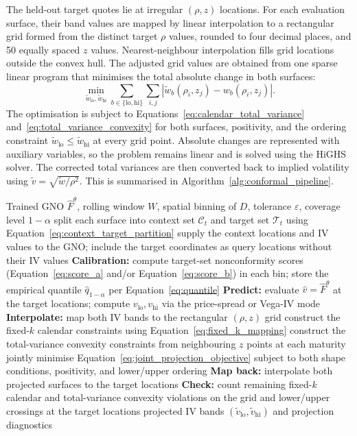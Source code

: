 The held-out target quotes lie at irregular $(\rho,z)$ locations. For each evaluation surface, their band values are mapped by linear interpolation to a rectangular grid formed from the distinct target $\rho$ values, rounded to four decimal places, and 50 equally spaced $z$ values. Nearest-neighbour interpolation fills grid locations outside the convex hull. The adjusted grid values are obtained from one sparse linear program that minimises the total absolute change in both surfaces:
\begin{equation}
    \min_{\widetilde w_{\mathrm{lo}},\widetilde w_{\mathrm{hi}}}
    \sum_{b\in\{\mathrm{lo},\mathrm{hi}\}}\sum_{i,j}
    \left|\widetilde w_b(\rho_i,z_j)-w_b(\rho_i,z_j)\right|.
    \label{eq:joint_projection_objective}
\end{equation}
The optimisation is subject to Equations~\ref{eq:calendar_total_variance} and~\ref{eq:total_variance_convexity} for both surfaces, positivity, and the ordering constraint $\widetilde w_{\mathrm{lo}}\leq\widetilde w_{\mathrm{hi}}$ at every grid point. Absolute changes are represented with auxiliary variables, so the problem remains linear and is solved using the HiGHS solver. The corrected total variances are then converted back to implied volatility using $\widetilde v=\sqrt{\widetilde w/\rho^2}$. This is summarised in Algorithm~\ref{alg:conformal_pipeline}.

\begin{algorithm}
\caption{Conformal bands with finite-grid shape projection}
\label{alg:conformal_pipeline}
\begin{algorithmic}[1]
\Require Trained GNO $\hat{F}^\theta$, rolling window $W$, spatial binning of $D$, tolerance $\varepsilon$, coverage level $1-\alpha$
\State split each surface into context set $\mathcal{C}_t$ and target set $\mathcal{T}_t$ using Equation~\ref{eq:context_target_partition}
\State supply the context locations and IV values to the GNO; include the target coordinates as query locations without their IV values
\State \textbf{Calibration:} compute target-set nonconformity scores (Equation~\ref{eq:score_a} and/or Equation~\ref{eq:score_b}) in each bin; store the empirical quantile $\hat{q}_{1-\alpha}$ per Equation~\ref{eq:quantile}
\State \textbf{Predict:} evaluate $\hat{v} = \hat{F}^\theta$ at the target locations; compute $v_{\text{lo}}, v_{\text{hi}}$ via the price-spread or Vega-IV mode
\State \textbf{Interpolate:} map both IV bands to the rectangular $(\rho,z)$ grid
\State construct the fixed-$k$ calendar constraints using Equation~\ref{eq:fixed_k_mapping}
\State construct the total-variance convexity constraints from neighbouring $z$ points at each maturity
\State jointly minimise Equation~\ref{eq:joint_projection_objective} subject to both shape conditions, positivity, and lower/upper ordering
\State \textbf{Map back:} interpolate both projected surfaces to the target locations
\State \textbf{Check:} count remaining fixed-$k$ calendar and total-variance convexity violations on the grid and lower/upper crossings at the target locations
\State \Return projected IV bands $(\tilde{v}_{\text{lo}},\tilde{v}_{\text{hi}})$ and projection diagnostics
\end{algorithmic}
\end{algorithm}


